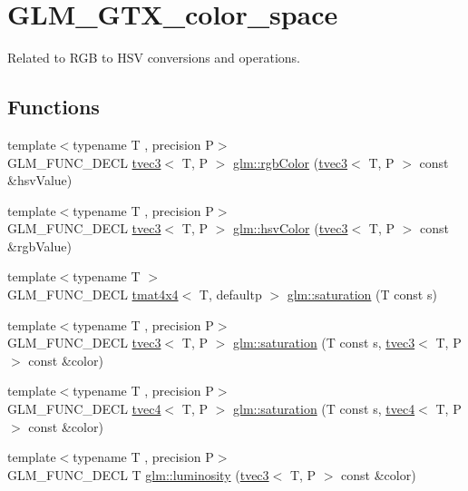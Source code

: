 \hypertarget{group__gtx__color__space}{}\section{G\+L\+M\+\_\+\+G\+T\+X\+\_\+color\+\_\+space}
\label{group__gtx__color__space}


Related to R\+GB to H\+SV conversions and operations.  


\subsection*{Functions}
\begin{DoxyCompactItemize}
\item 
{\footnotesize template$<$typename T , precision P$>$ }\\G\+L\+M\+\_\+\+F\+U\+N\+C\+\_\+\+D\+E\+CL \hyperlink{structglm_1_1tvec3}{tvec3}$<$ T, P $>$ \hyperlink{group__gtx__color__space_ga36b0619e31daf57bc4a54dac2dcf34b7}{glm\+::rgb\+Color} (\hyperlink{structglm_1_1tvec3}{tvec3}$<$ T, P $>$ const \&hsv\+Value)
\item 
{\footnotesize template$<$typename T , precision P$>$ }\\G\+L\+M\+\_\+\+F\+U\+N\+C\+\_\+\+D\+E\+CL \hyperlink{structglm_1_1tvec3}{tvec3}$<$ T, P $>$ \hyperlink{group__gtx__color__space_gae72039c00a7be2f03a3b94b37a54349a}{glm\+::hsv\+Color} (\hyperlink{structglm_1_1tvec3}{tvec3}$<$ T, P $>$ const \&rgb\+Value)
\item 
{\footnotesize template$<$typename T $>$ }\\G\+L\+M\+\_\+\+F\+U\+N\+C\+\_\+\+D\+E\+CL \hyperlink{structglm_1_1tmat4x4}{tmat4x4}$<$ T, defaultp $>$ \hyperlink{group__gtx__color__space_gafecfb15d58da8445103745af3348e516}{glm\+::saturation} (T const s)
\item 
{\footnotesize template$<$typename T , precision P$>$ }\\G\+L\+M\+\_\+\+F\+U\+N\+C\+\_\+\+D\+E\+CL \hyperlink{structglm_1_1tvec3}{tvec3}$<$ T, P $>$ \hyperlink{group__gtx__color__space_ga632ee8dadb44e90a05885f6f8c07d46c}{glm\+::saturation} (T const s, \hyperlink{structglm_1_1tvec3}{tvec3}$<$ T, P $>$ const \&color)
\item 
{\footnotesize template$<$typename T , precision P$>$ }\\G\+L\+M\+\_\+\+F\+U\+N\+C\+\_\+\+D\+E\+CL \hyperlink{structglm_1_1tvec4}{tvec4}$<$ T, P $>$ \hyperlink{group__gtx__color__space_ga2033e0566c595230714af396744e8a61}{glm\+::saturation} (T const s, \hyperlink{structglm_1_1tvec4}{tvec4}$<$ T, P $>$ const \&color)
\item 
{\footnotesize template$<$typename T , precision P$>$ }\\G\+L\+M\+\_\+\+F\+U\+N\+C\+\_\+\+D\+E\+CL T \hyperlink{group__gtx__color__space_gaa2f38a5100c3e1c7d39920df43bd8cbe}{glm\+::luminosity} (\hyperlink{structglm_1_1tvec3}{tvec3}$<$ T, P $>$ const \&color)
\end{DoxyCompactItemize}


